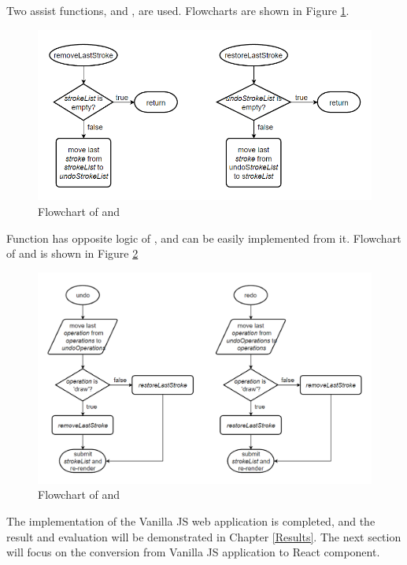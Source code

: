 \documentclass[12pt,twoside]{report}
\begin{document}
Two assist functions,  and , are
used. Flowcharts are shown in Figure \ref{fig:flowchart-helpfunc}.
\begin{figure}[h]
    \centering
    \includegraphics[width=\linewidth]{figures/flowchart-helpfunc.png}
    \caption{Flowchart of  and }
    \label{fig:flowchart-helpfunc}
\end{figure}

Function  has opposite logic of , and can be easily implemented from it. Flowchart of  and  is shown in Figure \ref{fig:flowchart-undoredo}
\begin{figure}[H]
    \centering
    \includegraphics[width=\linewidth, frame]{figures/flowchart-undoredo.png}
    \caption{Flowchart of  and }
    \label{fig:flowchart-undoredo}
\end{figure}

The implementation of the Vanilla JS web application is completed, and the result and evaluation will be demonstrated in Chapter \ref{Results}. The next section will focus on the conversion from Vanilla JS application to React component.
\end{document}

